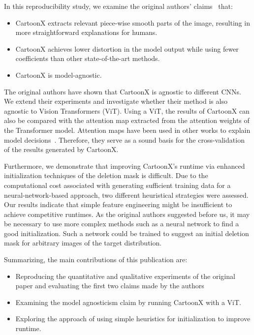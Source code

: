 In this reproducibility study, we examine the original authors' claims~\cite{cartoonX} that:
\begin{itemize}
\setlength\itemsep{-0.1em}
    \item CartoonX extracts relevant piece-wise smooth parts of the image, resulting in more straightforward explanations for humans.
    \item CartoonX achieves lower distortion in the model output while using fewer coefficients than other state-of-the-art methods.
    \item CartoonX is model-agnostic.
\end{itemize}

The original authors have shown that CartoonX is agnostic to different CNNs.
We extend their experiments and investigate whether their method is also agnostic to Vision Transformers (ViT).
Using a ViT, the results of CartoonX can also be compared with the attention map extracted from the attention weights of the Transformer model.
Attention maps have been used in other works to explain model decisions~\cite{chefer2021transformer}.
Therefore, they serve as a sound basis for the cross-validation of the results generated by CartoonX. 

Furthermore, we demonstrate that improving CartoonX's runtime via enhanced initialization techniques of the deletion mask is difficult. 
Due to the computational cost associated with generating sufficient training data for a neural-network-based approach, two different heuristical strategies were assessed.
Our results indicate that simple feature engineering might be insufficient to achieve competitive runtimes.
As the original authors suggested before us, it may be necessary to use more complex methods such as a neural network to find a good initialization.
Such a network could be trained to suggest an initial deletion mask for arbitrary images of the target distribution.



Summarizing, the main contributions of this publication are:
\begin{itemize}
\setlength\itemsep{0.1em}
    \item Reproducing the quantitative and qualitative experiments of the original paper and evaluating the first two claims made by the authors
    \item Examining the model agnosticism claim by running CartoonX with a ViT.
    \item Exploring the approach of using simple heuristics for initialization to improve runtime.
\end{itemize}